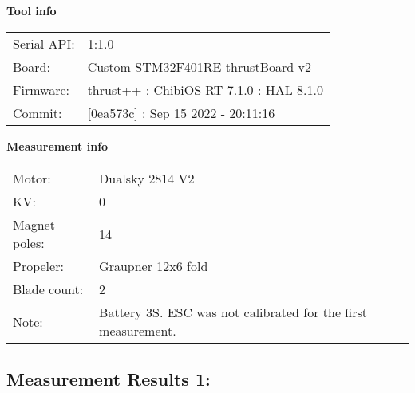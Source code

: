 \documentclass[10pt]{article}
\begin{document}
\noindent
{\large \bf Tool info}
\vspace{3mm}

\noindent
\begin{tabular}{ll}
Serial API:  & 1:1.0\\ 
Board:       & Custom STM32F401RE thrustBoard v2\\ 
Firmware:    & thrust++ : ChibiOS RT 7.1.0 : HAL 8.1.0\\ 
Commit:      & [0ea573c] : Sep 15 2022 - 20:11:16
\end{tabular}
\vspace{3mm}

\noindent
{\large \bf Measurement info}
\vspace{3mm}

\noindent
\begin{tabular}{ll}
Motor:        & Dualsky 2814 V2\\ 
KV:           & 0\\ 
Magnet poles: & 14\\ 
Propeler:     & Graupner 12x6 fold\\ 
Blade count:  & 2\\ 
Note:         & Battery 3S. ESC was not calibrated for the first measurement.
\end{tabular}

\vspace{3mm}


\subsection*{\large \bf Measurement Results 1:}
\end{document}
